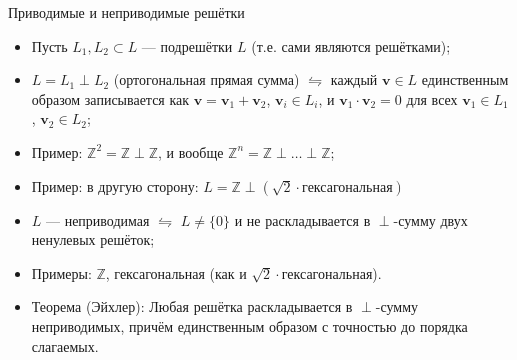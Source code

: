 \documentclass[serif, aspectratio=169]{beamer}
\begin{document}
\begin{frame}{Приводимые и неприводимые решётки}
    \begin{itemize}
        \item Пусть $L_1, L_2 \subset L$ --- подрешётки $L$ (т.е. сами являются решётками);
        \item $L=L_1\perp L_2$ (ортогональная прямая сумма) $\leftrightharpoons$ каждый $\mathbf{v}\in L$ единственным образом записывается как $\mathbf{v}=\mathbf{v}_1+\mathbf{v}_2$, $\mathbf{v}_i\in L_i$, и $\mathbf{v}_1\cdot\mathbf{v}_2=0$ для всех $\mathbf{v}_1\in L_1$, $\mathbf{v}_2\in L_2$;%
        \item Пример: $\mathbb{Z}^2=\mathbb{Z}\perp\mathbb{Z}$, и вообще $\mathbb{Z}^n=\mathbb{Z}\perp\dots\perp\mathbb{Z}$;
        \item Пример: в другую сторону: $L=\mathbb{Z}\perp(\sqrt2\cdot\text{гексагональная})$
        \item $L$ --- неприводимая $\leftrightharpoons$ $L\neq\{0\}$ и не раскладывается в $\perp$-сумму двух ненулевых решёток;
        \item Примеры: $\mathbb{Z}$, гексагональная (как и $\sqrt2\cdot$гексагональная).
        \item Теорема (Эйхлер): Любая решётка раскладывается в $\perp$-сумму неприводимых, причём единственным образом с точностью до порядка слагаемых.
    \end{itemize}
\end{frame}
\end{document}
